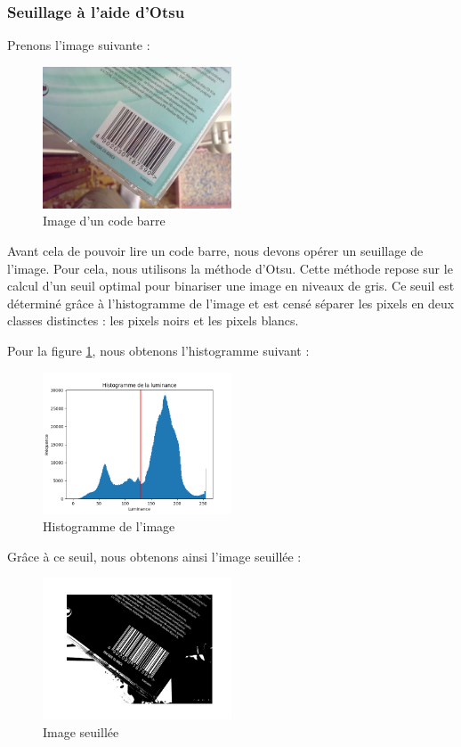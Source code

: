 \documentclass{rapport}
\begin{document}
\subsubsection*{Seuillage à l'aide d'Otsu}
Prenons l'image suivante :
\begin{figure}[H] %
	\centering
	\includegraphics[width=0.5\textwidth]{images/barcode0.jpg}
	\caption{Image d'un code barre}
	\label{code_barre}
\end{figure}

Avant cela de pouvoir lire un code barre, nous devons opérer un seuillage de l'image. Pour cela, nous utilisons la méthode d'Otsu.
Cette méthode repose sur le calcul d'un seuil optimal pour binariser une image en niveaux de gris.
Ce seuil est déterminé grâce à l'histogramme de l'image et est censé séparer les pixels en deux classes distinctes : les pixels noirs et les pixels blancs.

Pour la figure \ref{code_barre}, nous obtenons l'histogramme suivant :

\begin{figure}[H] 
	\centering
	\includegraphics[width=0.5\textwidth]{images/histogramme.png}
	\caption{Histogramme de l'image}
	\label{histogramme}
\end{figure}

Grâce à ce seuil, nous obtenons ainsi l'image seuillée : 
\begin{figure}[H] 
	\centering
	\includegraphics[width=0.5\textwidth]{images/barcode_seuillee.png}
	\caption{Image seuillée}
	\label{img_seuillee}
\end{figure}
\end{document}
